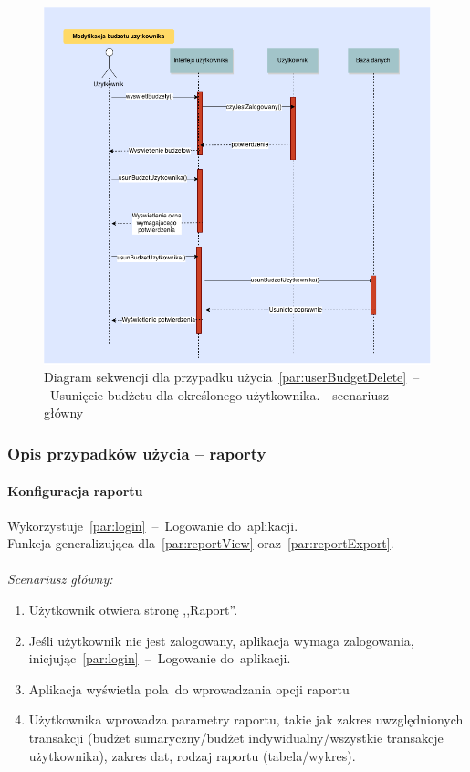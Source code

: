 \begin{figure}[H]
    \includegraphics[width=\textwidth,
    height=0.5\textheight]{images/usun_budzet_uzytkownika.png}
    \caption{Diagram sekwencji dla przypadku użycia~\ref{par:userBudgetDelete}~--~Usunięcie budżetu dla określonego użytkownika.
    - scenariusz główny}
\end{figure}

\subsubsection{Opis przypadków użycia -- raporty}
\paragraph{Konfiguracja raportu\newline}
\label{par:reportConfig}
Wykorzystuje~\ref{par:login}~--~Logowanie do~aplikacji.\\
\indent Funkcja generalizująca dla~\ref{par:reportView} oraz~\ref{par:reportExport}.\\\\
\textit{Scenariusz główny:}
\begin{enumerate}
  \item Użytkownik otwiera stronę ,,Raport''.
  \item Jeśli użytkownik nie jest zalogowany, aplikacja wymaga zalogowania, inicjując~\ref{par:login}~--~Logowanie do~aplikacji.
  \item Aplikacja wyświetla pola~do wprowadzania opcji raportu
  \item Użytkownika wprowadza parametry raportu, takie jak zakres uwzględnionych transakcji (budżet sumaryczny/budżet indywidualny/wszystkie transakcje użytkownika), zakres dat, rodzaj raportu (tabela/wykres).
\end{enumerate}

